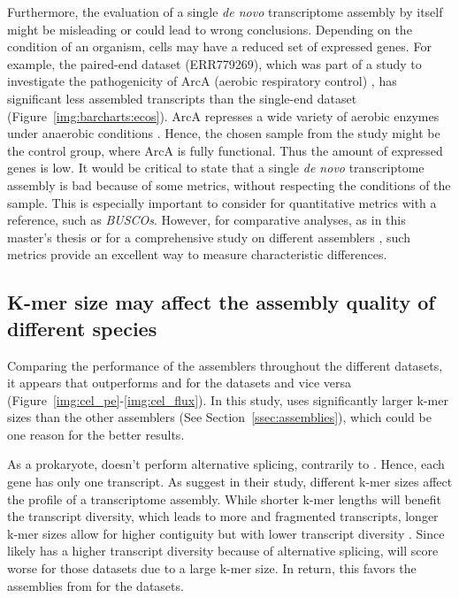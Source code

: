 \documentclass[12pt,a4paper,english]{article}
\begin{document}
		Furthermore, the evaluation of a single \textit{de novo} transcriptome assembly by itself might be misleading or could lead to wrong conclusions.
		Depending on the condition of an organism, cells may have a reduced set of expressed genes.
		For example, the paired-end \ecoli dataset (ERR779269), which was part of a study to investigate the pathogenicity of ArcA (aerobic respiratory control) \citep{arca_study:15}, has significant less assembled transcripts than the single-end \ecoli dataset (Figure~\ref{img:barcharts:ecos}).
		ArcA represses a wide variety of aerobic enzymes under anaerobic conditions \citep{arca_function:88}.
		Hence, the chosen sample from the study might be the control group, where ArcA is fully functional. Thus the amount of expressed genes is low.
		It would be critical to state that a single \textit{de novo} transcriptome assembly is bad because of some metrics, without respecting the conditions of the sample. This is especially important to consider for quantitative metrics with a reference, such as \textit{BUSCOs}.
		However, for comparative analyses, as in this master's thesis or for a comprehensive study on different assemblers \citep{hoelzer:19}, such metrics provide an excellent way to measure characteristic differences.

	\subsection{K-mer size may affect the assembly quality of different species}
	    Comparing the performance of the assemblers throughout the different datasets, it appears that \soap outperforms \spades and \trinity for the \ecoli datasets and vice versa (Figure~\ref{img:cel_pe}-\ref{img:cel_flux}).
		In this study, \soap uses significantly larger k-mer sizes than the other assemblers (See Section~\ref{ssec:assemblies}), which could be one reason for the better results.
		
		As a prokaryote, \ecoli doesn't perform alternative splicing, contrarily to \celegans \citep{celegans_splicing:17}. Hence, each gene has only one transcript.
		As \citeauthor{optimization:10} suggest in their study, different k-mer sizes affect the profile of a transcriptome assembly.
		While shorter k-mer lengths will benefit the transcript diversity, which leads to more and fragmented transcripts, longer k-mer sizes allow for higher contiguity but with lower transcript diversity \citep{optimization:10}.
		Since \celegans likely has a higher transcript diversity because of alternative splicing, \soap will score worse for those datasets due to a large k-mer size. In return, this favors the assemblies from \soap for the \ecoli datasets.
		
\end{document}
